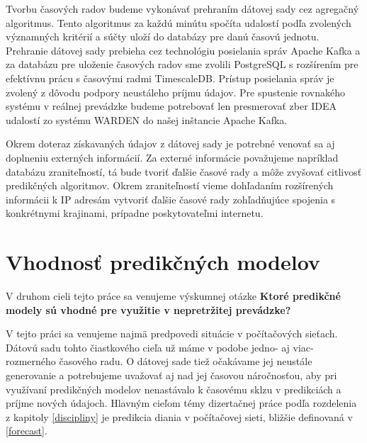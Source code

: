 \documentclass[thesismargins, thesislinespacing, openright, upjsfrontpage, combineabstracts]{rnthesis}
\begin{document}
Tvorbu časových radov budeme vykonávať prehraním dátovej sady cez agregačný algoritmus. Tento algoritmus za každú minútu spočíta udalostí podľa zvolených významných kritérií a súčty uloží do databázy pre danú časovú jednotu. Prehranie dátovej sady prebieha cez technológiu posielania správ Apache Kafka a za databázu pre uloženie časových radov sme zvolili PostgreSQL s rozšírením pre efektívnu prácu s časovými radmi TimescaleDB. Prístup posielania správ je zvolený z dôvodu podpory neustáleho príjmu údajov. Pre spustenie rovnakého systému v reálnej prevádzke budeme potrebovať len presmerovať zber IDEA udalostí zo systému WARDEN do našej inštancie Apache Kafka.

Okrem doteraz získavaných údajov z dátovej sady je potrebné venovať sa aj doplneniu externých informácií. Za externé informácie považujeme napríklad databázu zraniteľností, tá bude tvoriť ďalšie časové rady a môže zvyšovať citlivosť predikčných algoritmov. Okrem zraniteľností vieme dohľadaním rozšírených informácii k IP adresám vytvoriť ďalšie časové rady zohľadňujúce spojenia s konkrétnymi krajinami, prípadne poskytovateľmi internetu.

\section{Vhodnosť predikčných modelov}
V druhom cieli tejto práce sa venujeme výskumnej otázke \textbf{Ktoré predikčné modely sú vhodné pre využitie v nepretržitej prevádzke?}

V tejto práci sa venujeme najmä predpovedi situácie v počítačových sieťach. Dátovú sadu tohto čiastkového cieľa už máme v podobe jedno- aj viac- rozmerného časového radu. O dátovej sade tiež očakávame jej neustále generovanie a potrebujeme uvažovať aj nad jej časovou náročnosťou, aby pri využívaní predikčných modelov nenastávalo k časovému sklzu v predikciách a príjme nových údajoch. Hlavným cieľom témy dizertačnej práce podľa rozdelenia z kapitoly \ref{discipliny} je predikcia diania v počítačovej sieti, bližšie definovaná v \ref{forecast}.

\end{document}
